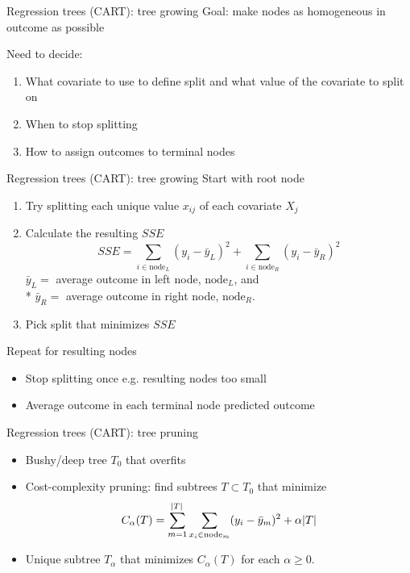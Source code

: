 \documentclass{beamer}
\begin{document}
\begin{frame}{Regression trees (CART): tree growing}
  Goal: make nodes as homogeneous in outcome as possible
  
  \pause
  Need to decide:
  \begin{enumerate}[<+->]
    \item What covariate to use to define split and what value of the covariate to split on
    \item When to stop splitting
    \item How to assign outcomes to terminal nodes
  \end{enumerate}
\end{frame}

\begin{frame}{Regression trees (CART): tree growing}
  Start with root node
  
  \begin{enumerate}[<+(1)->]
  \item Try splitting each unique value $x_{ij}$ of each covariate $X_{j}$
  \item Calculate the resulting $SSE$
  \begin{equation*}
    SSE = \sum_{i \in \text{node}_{L}} (y_{i} - \bar{y}_{L})^2 + \sum_{i \in \text{node}_{R}} (y_{i} - \bar{y}_{R})^2
  \end{equation*}
  $\bar{y}_{L} = $ average outcome in left node, $\text{node}_{L}$, and \\*   $\bar{y}_{R} = $ average outcome in right node, $\text{node}_{R}$.
  \item Pick split that minimizes $SSE$
    \end{enumerate}
  \pause
  Repeat for resulting nodes 
    
  \begin{itemize}[<+(1)->]
  \item Stop splitting once e.g. resulting nodes too small
  \item Average outcome in each terminal node predicted outcome 
  \end{itemize}
\end{frame}

\begin{frame}[c]{Regression trees (CART): tree pruning}
  \begin{itemize}[<+->]
    \item Bushy/deep tree $T_{0}$ that overfits
    \item Cost-complexity pruning: find subtrees $T \subset T_{0}$ that minimize
    \begin{equation*}
        C_{\alpha}(T) = \sum_{m = 1}^{\abs{T}} \sum_{x_{i} \in \text{node}_{m}} (y_{i} - \bar{y}_{m})^2 + \alpha \abs{T}
    \end{equation*}
    \item Unique subtree $T_{\alpha}$ that minimizes $C_{\alpha}(T)$ for each $\alpha \geq 0$.
  \end{itemize}
\end{frame}
\end{document}
